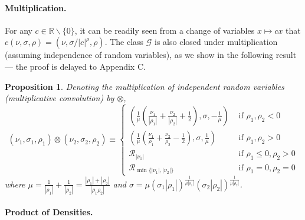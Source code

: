 \documentclass{article}
\newtheorem{proposition}{Proposition}
\theoremstyle{definition}
\newcommand{\feynman}[1]{\todo{(Feynman): #1}}
\begin{document}
\paragraph{Multiplication.}
For any $c \in \mathbb{R} \backslash \{0\}$, it can be readily seen from a change of variables $x \mapsto c x$ that $c (\nu, \sigma, \rho) = (\nu, \sigma / |c|^\rho, \rho)$. The class $\mathcal{G}$ is also closed under multiplication (assuming independence of random variables), as we show in the following result --- the proof is delayed to Appendix C.
\begin{proposition}
\label{prop:Mult}
Denoting the multiplication of independent random variables (multiplicative convolution) by $\otimes$,
\[
(\nu_{1},\sigma_{1},\rho_{1})\otimes(\nu_{2},\sigma_{2},\rho_{2})
\equiv\begin{cases}
\left(\frac{1}{\mu}\left(\frac{\nu_{1}}{|\rho_{1}|}+\frac{\nu_{2}}{|\rho_{2}|}+\frac{1}{2}\right),\sigma,-\frac{1}{\mu}\right) & \text{ if }\rho_{1},\rho_{2}<0\\
\left(\frac{1}{\mu}\left(\frac{\nu_{1}}{\rho_{1}}+\frac{\nu_{2}}{\rho_{2}}-\frac{1}{2}\right),\sigma,\frac{1}{\mu}\right) & \text{ if }\rho_{1},\rho_{2}>0\\
\mathcal{R}_{|\nu_1|} & \mbox{ if }\rho_{1}\leq0,\rho_{2}>0 \\
\mathcal{R}_{\min\{|\nu_1|,|\nu_2|\}} & \mbox{ if }\rho_{1}=0,\rho_{2}=0
\end{cases}
\]
where $\mu=\frac{1}{|\rho_{1}|}+\frac{1}{|\rho_{2}|}=\frac{|\rho_{1}|+|\rho_{2}|}{|\rho_{1}\rho_{2}|}$ and $\sigma=\mu(\sigma_{1}|\rho_{1}|)^{\frac{1}{\mu|\rho_{1}|}}(\sigma_{2}|\rho_{2}|)^{\frac{1}{\mu|\rho_{2}|}}$. 
\end{proposition}



\paragraph{Product of Densities.}
\end{document}
